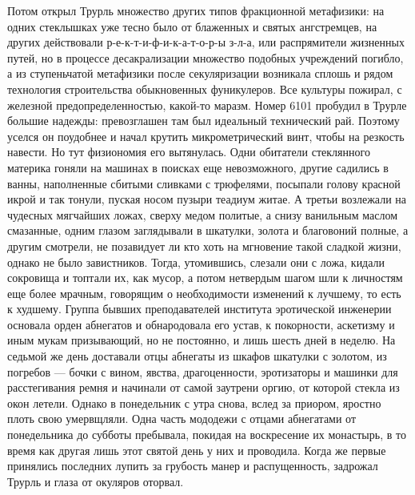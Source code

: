 Потом открыл Трурль множество других типов фракционной
метафизики: на одних стеклышках уже тесно было от блаженных
и святых ангстремцев, на других действовали
р-е-к-т-и-ф-и-к-а-т-о-р-ы з-л-а, или распрямители жизненных
путей, но в процессе десакрализации множество подобных
учреждений погибло, а из ступеньчатой метафизики после
секуляризации возникала сплошь и рядом технология
строительства обыкновенных фуникулеров. Все культуры
пожирал, с железной предопределенностью, какой-то маразм.
Номер 6101 пробудил в Трурле большие надежды: превозглашен
там был идеальный технический рай. Поэтому уселся он
поудобнее и начал крутить микрометрический винт, чтобы на
резкость навести. Но тут физиономия его вытянулась. Одни
обитатели стеклянного материка гоняли на машинах в поисках
еще невозможного, другие садились в ванны, наполненные
сбитыми сливками с трюфелями, посыпали голову красной икрой
и так тонули, пуская носом пузыри теадиум житае. А третьи
возлежали на чудесных мягчайших ложах, сверху медом политые,
а снизу ванильным маслом смазанные, одним глазом заглядывали
в шкатулки, золота и благовоний полные, а другим смотрели,
не позавидует ли кто хоть на мгновение такой сладкой жизни,
однако не было завистников. Тогда, утомившись, слезали они с
ложа, кидали сокровища и топтали их, как мусор, а потом
нетвердым шагом шли к личностям еще более мрачным, говорящим
о необходимости изменений к лучшему, то есть к худшему.
Группа бывших преподавателей института эротической инженерии
основала орден абнегатов и обнародовала его устав, к
покорности, аскетизму и иным мукам призывающий, но не
постоянно, и лишь шесть дней в неделю. На седьмой же день
доставали отцы абнегаты из шкафов шкатулки с золотом, из
погребов --- бочки с вином, явства, драгоценности, эротизаторы
и машинки для расстегивания ремня и начинали от самой
заутрени оргию, от которой стекла из окон летели. Однако в
понедельник с утра снова, вслед за приором, яростно плоть
свою умервщляли. Одна часть мододежи с отцами абнегатами от
понедельника до субботы пребывала, покидая на воскресение их
монастырь, в то время как другая лишь этот святой день у них
и проводила. Когда же первые принялись последних лупить за
грубость манер и распущенность, задрожал Трурль и глаза от
окуляров оторвал.

